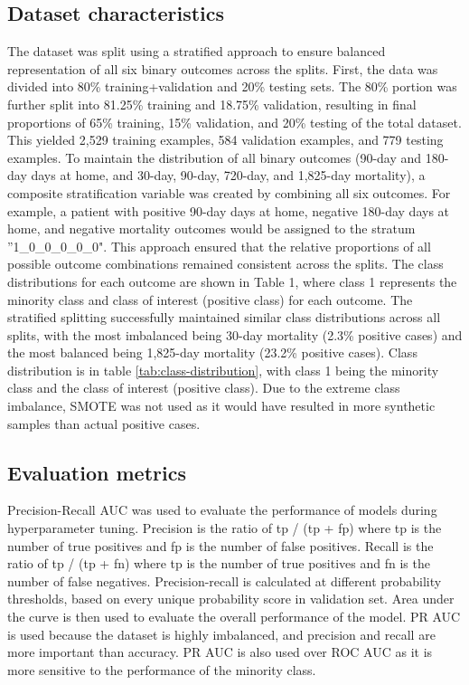 \documentclass{article}
\begin{document}
\subsection{Dataset characteristics}

The dataset was split using a stratified approach to ensure balanced representation of all six binary outcomes across the splits. First, the data was divided into 80\% training+validation and 20\% testing sets. The 80\% portion was further split into 81.25\% training and 18.75\% validation, resulting in final proportions of 65\% training, 15\% validation, and 20\% testing of the total dataset. This yielded 2,529 training examples, 584 validation examples, and 779 testing examples.
To maintain the distribution of all binary outcomes (90-day and 180-day days at home, and 30-day, 90-day, 720-day, and 1,825-day mortality), a composite stratification variable was created by combining all six outcomes. For example, a patient with positive 90-day days at home, negative 180-day days at home, and negative mortality outcomes would be assigned to the stratum ''1\_0\_0\_0\_0\_0". This approach ensured that the relative proportions of all possible outcome combinations remained consistent across the splits.
The class distributions for each outcome are shown in Table 1, where class 1 represents the minority class and class of interest (positive class) for each outcome. The stratified splitting successfully maintained similar class distributions across all splits, with the most imbalanced being 30-day mortality (2.3\% positive cases) and the most balanced being 1,825-day mortality (23.2\% positive cases).
Class distribution is in table \ref{tab:class-distribution}, with class 1 being the minority class and the class of interest (positive class). Due to the extreme class imbalance, SMOTE was not used as it would have resulted in more synthetic samples than actual positive cases.

\subsection {Evaluation metrics}

Precision-Recall AUC was used to evaluate the performance of models during hyperparameter tuning. Precision is the ratio of tp / (tp + fp) where tp is the number of true positives and fp is the number of false positives. Recall is the ratio of tp / (tp + fn) where tp is the number of true positives and fn is the number of false negatives. Precision-recall is calculated at different probability thresholds, based on every unique probability score in validation set. Area under the curve is then used to evaluate the overall performance of the model. PR AUC is used because the dataset is highly imbalanced, and precision and recall are more important than accuracy. PR AUC is also used over ROC AUC as it is more sensitive to the performance of the minority class.
\end{document}
